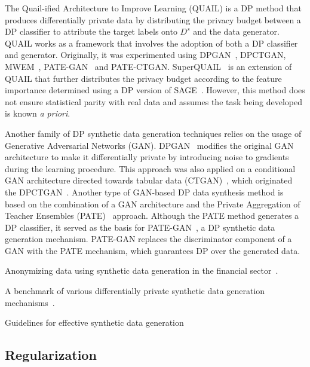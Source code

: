 \documentclass[parskip=full]{scrartcl}
\begin{document}
The Quail-ified Architecture to Improve Learning (QUAIL) is a DP method that
produces differentially private data by distributing the privacy budget
between a DP classifier to attribute the target labels onto $D^s$ and the data
generator. QUAIL works as a framework that involves the adoption of both a DP
classifier and generator. Originally, it was experimented using
DPGAN~\cite{xie2018differentially}, DPCTGAN, MWEM~\cite{hardt2012simple},
PATE-GAN~\cite{jordon2018pate} and PATE-CTGAN\@.
SuperQUAIL~\cite{rosenblatt2022spending} is an extension of QUAIL that further
distributes the privacy budget according to the feature importance determined
using a DP version of SAGE~\cite{covert2020understanding}. However, this
method does not ensure statistical parity with real data and assumes the task
being developed is known \textit{a priori}.

Another family of DP synthetic data generation techniques relies on the usage
of Generative Adversarial Networks (GAN). DPGAN~\cite{xie2018differentially}
modifies the original GAN architecture to make it differentially private by
introducing noise to gradients during the learning procedure. This approach
was also applied on a conditional GAN architecture directed towards tabular
data (CTGAN)~\cite{xu2019modeling}, which originated the
DPCTGAN~\cite{rosenblatt2020differentially}. Another type of GAN-based DP data
synthesis method is based on the combination of a GAN architecture and the
Private Aggregation of Teacher Ensembles (PATE)~\cite{papernot2017semi}
approach. Although the PATE method generates a DP classifier, it served as the
basis for PATE-GAN~\cite{jordon2018pate}, a DP synthetic data generation
mechanism. PATE-GAN replaces the discriminator component of a GAN with the
PATE mechanism, which guarantees DP over the generated data.




Anonymizing data using synthetic data generation in the financial
sector~\cite{assefa2020generating}.


A benchmark of various differentially private synthetic data generation
mechanisms~\cite{tao2021benchmarking}.


Guidelines for effective synthetic data generation~\cite{dankar2021fake}





\subsection{Regularization}~\label{sec:regularization}
\end{document}
